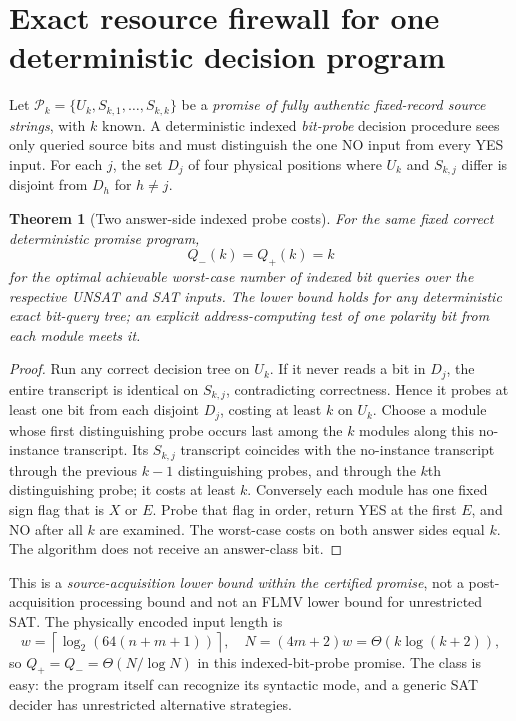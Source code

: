 \documentclass[11pt]{article}
\newtheorem{theorem}{Theorem}
\begin{document}
\section{Exact resource firewall for one deterministic decision program}
Let $\mathcal P_k=\{U_k,S_{k,1},\ldots,S_{k,k}\}$ be a \emph{promise of fully authentic fixed-record source strings}, with $k$ known. A deterministic indexed \emph{bit-probe} decision procedure sees only queried source bits and must distinguish the one NO input from every YES input. For each $j$, the set $D_j$ of four physical positions where $U_k$ and $S_{k,j}$ differ is disjoint from $D_h$ for $h\ne j$.
\begin{theorem}[Two answer-side indexed probe costs]
For the same fixed correct deterministic promise program,
\[
\boxed{Q_-(k)=Q_+(k)=k}\tag{3}
\]
for the optimal achievable worst-case number of indexed bit queries over the respective UNSAT and SAT inputs. The lower bound holds for \emph{any} deterministic exact bit-query tree; an explicit address-computing test of one polarity bit from each module meets it.
\end{theorem}
\begin{proof}
Run any correct decision tree on $U_k$. If it never reads a bit in $D_j$, the entire transcript is identical on $S_{k,j}$, contradicting correctness. Hence it probes at least one bit from each disjoint $D_j$, costing at least $k$ on $U_k$. Choose a module whose first distinguishing probe occurs last among the $k$ modules along this no-instance transcript. Its $S_{k,j}$ transcript coincides with the no-instance transcript through the previous $k-1$ distinguishing probes, and through the $k$th distinguishing probe; it costs at least $k$. Conversely each module has one fixed sign flag that is $X$ or $E$. Probe that flag in order, return YES at the first $E$, and NO after all $k$ are examined. The worst-case costs on both answer sides equal $k$. The algorithm does not receive an answer-class bit.\end{proof}
This is a \emph{source-acquisition lower bound within the certified promise}, not a post-acquisition processing bound and not an FLMV lower bound for unrestricted SAT. The physically encoded input length is
\[
 w=\left\lceil\log_2(64(n+m+1))\right\rceil,\quad N=(4m+2)w=\Theta(k\log(k+2)),
\]
so $Q_+=Q_-=\Theta(N/\log N)$ in this indexed-bit-probe promise. The class is easy: the program itself can recognize its syntactic mode, and a generic SAT decider has unrestricted alternative strategies.
\end{document}
